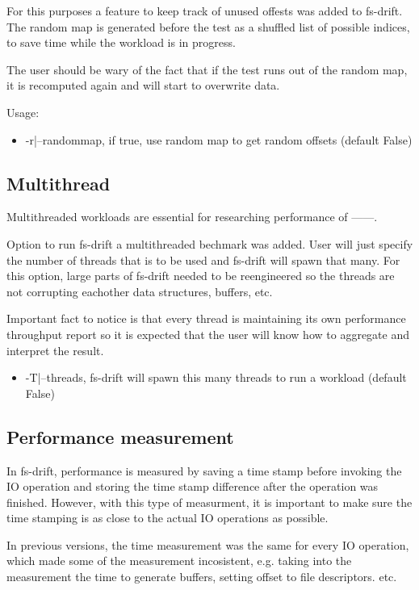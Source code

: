 \documentclass[
  color, %
  table, %
  lof,   %
  lot,   %
]{fithesis3}
\begin{document}
For this purposes a feature to keep track of unused offests was added to fs-drift. The random map is generated before the test as a shuffled list of possible indices, to save time while the workload is in progress.

The user should be wary of the fact that if the test runs out of the random map, it is recomputed again and will start to overwrite data.

Usage:
\begin{itemize}
    \item -r|--randommap, if true, use random map to get random offsets (default False)
\end{itemize}

\subsection{Multithread}
Multithreaded workloads are essential for researching performance of ------.

Option to run fs-drift a multithreaded bechmark was added. User will just specify the number of threads that is to be used and fs-drift will spawn that many. For this option, large parts of fs-drift needed to be reengineered so the threads are not corrupting eachother data structures, buffers, etc.

Important fact to notice is that every thread is maintaining its own performance throughput report so it is expected that the user will know how to aggregate and interpret the result.


\begin{itemize}
    \item -T|--threads, fs-drift will spawn this many threads to run a workload (default False)
\end{itemize}


\subsection{Performance measurement}
In fs-drift, performance is measured by saving a time stamp before invoking the IO operation and storing the time stamp difference after the operation was finished. However, with this type of measurment, it is important to make sure the time stamping is as close to the actual IO operations as possible. 

In previous versions, the time measurement was the same for every IO operation, which made some of the measurement incosistent, e.g. taking into the measurement the time to generate buffers, setting offset to file descriptors. etc.
\end{document}
